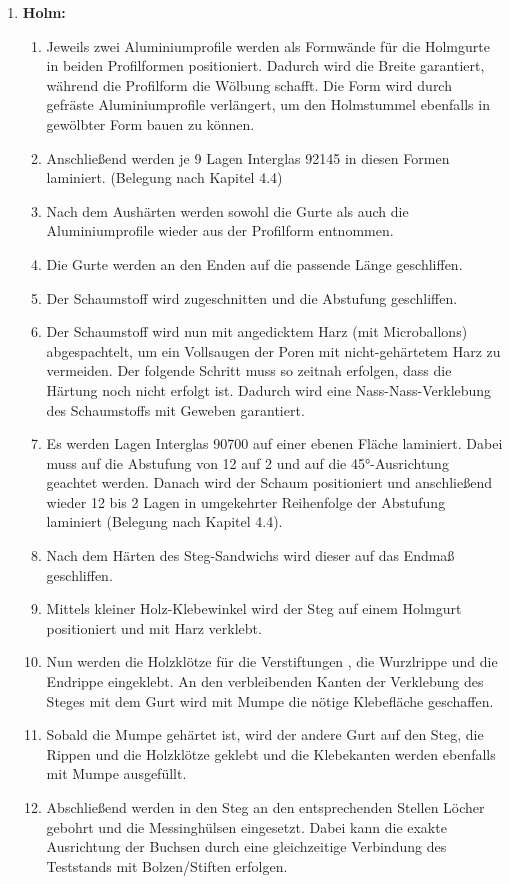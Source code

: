 \begin{enumerate}
	\item \textbf{Holm:}
	\begin{enumerate}
		\item Jeweils zwei Aluminiumprofile werden als Formwände für die Holmgurte in beiden Profilformen positioniert. Dadurch wird die Breite garantiert, während die Profilform die Wölbung schafft. Die Form wird durch gefräste Aluminiumprofile verlängert, um den Holmstummel ebenfalls in gewölbter Form bauen zu können. 
		\item Anschließend werden je 9 Lagen Interglas 92145 in diesen Formen laminiert. (Belegung nach Kapitel  4.4) 
		\item Nach dem Aushärten werden sowohl die Gurte als auch die Aluminiumprofile wieder aus der Profilform entnommen. 
		\item Die Gurte werden an den Enden auf die passende Länge geschliffen.
		\item Der Schaumstoff wird zugeschnitten und die Abstufung geschliffen.
		\item Der Schaumstoff wird nun mit angedicktem Harz (mit Microballons) \glqq abgespachtelt\grqq, um ein Vollsaugen der Poren mit nicht-gehärtetem Harz zu vermeiden. Der folgende Schritt muss so zeitnah erfolgen, dass die Härtung noch nicht erfolgt ist. Dadurch wird eine Nass-Nass-Verklebung des Schaumstoffs mit Geweben garantiert.
		\item Es werden Lagen Interglas 90700 auf einer ebenen Fläche laminiert. Dabei muss auf die Abstufung von 12 auf 2 und auf die 45°-Ausrichtung geachtet werden. Danach wird der Schaum positioniert und anschließend wieder 12 bis 2 Lagen in umgekehrter Reihenfolge der Abstufung laminiert (Belegung nach Kapitel 4.4).
		\item Nach dem Härten des Steg-Sandwichs wird dieser auf das Endmaß geschliffen.
		\item Mittels kleiner Holz-Klebewinkel wird der Steg auf einem Holmgurt positioniert und mit Harz verklebt.
		\item Nun werden die Holzklötze für die Verstiftungen , die Wurzlrippe und die Endrippe eingeklebt. An den verbleibenden Kanten der Verklebung des Steges mit dem Gurt wird mit Mumpe die nötige Klebefläche geschaffen.
		\item Sobald die Mumpe gehärtet ist, wird der andere Gurt auf den Steg, die Rippen und die Holzklötze geklebt und die Klebekanten werden ebenfalls mit Mumpe ausgefüllt.
		\item Abschließend werden in den Steg an den entsprechenden Stellen Löcher gebohrt und die Messinghülsen eingesetzt. Dabei kann die exakte Ausrichtung der Buchsen durch eine gleichzeitige Verbindung des Teststands mit Bolzen/Stiften erfolgen.

\end{enumerate}
\end{enumerate}
